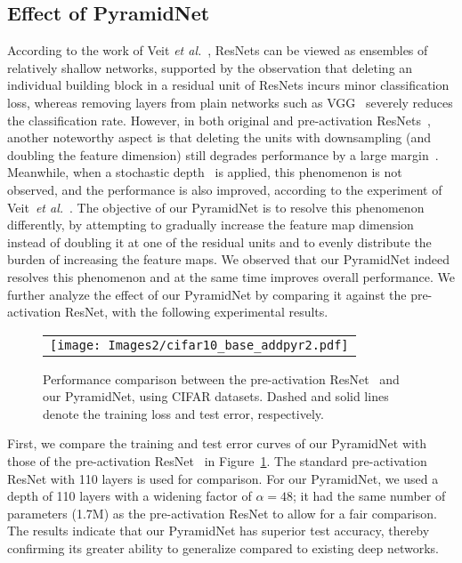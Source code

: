 \documentclass[10pt,twocolumn,letterpaper]{article}
\begin{document}
\subsection{Effect of PyramidNet}
According to the work of Veit {\it et al.}~\cite{ensemble}, ResNets can be viewed as ensembles of relatively shallow networks, supported by the observation that deleting an individual building block in a residual unit of ResNets incurs minor classification loss, whereas removing layers from plain networks such as VGG~\cite{VGG} severely reduces the classification rate. However, in both original and pre-activation ResNets~\cite{resnet,preresnet}, another noteworthy aspect is that deleting the units with downsampling (and doubling the feature dimension) still degrades performance by a large margin~\cite{ensemble}. Meanwhile, when a stochastic depth~\cite{stochasticdepth} is applied, this phenomenon is not observed, and the performance is also improved, according to the experiment of Veit~{\it et al.}~\cite{ensemble}. The objective of our PyramidNet is to resolve this phenomenon differently, by attempting to gradually increase the feature map dimension instead of doubling it at one of the residual units and to evenly distribute the burden of increasing the feature maps. We observed that our PyramidNet indeed resolves this phenomenon and at the same time improves overall performance. We further analyze the effect of our PyramidNet by comparing it against the pre-activation ResNet, with the following experimental results.
\begin{figure}[t]
\begin{center}
\begin{tabular}{c}
\texttt{[image: Images2/cifar10\_base\_addpyr2.pdf]}
\end{tabular}
\end{center}
\caption{Performance comparison between the pre-activation ResNet~\cite{preresnet} and our PyramidNet, using CIFAR datasets. Dashed and solid lines denote the training loss and test error, respectively.}
\label{fig:curves}
\end{figure}
First, we compare the training and test error curves of our PyramidNet with those of the pre-activation ResNet~\cite{preresnet} in Figure~\ref{fig:curves}. The standard pre-activation ResNet with 110 layers is used for comparison. For our PyramidNet, we used a depth of 110 layers with a widening factor of $\alpha=48$; it had the same number of parameters (1.7M) as the pre-activation ResNet to allow for a fair comparison. The results indicate that our PyramidNet has superior test accuracy, thereby confirming its greater ability to generalize compared to existing deep networks.
\end{document}
